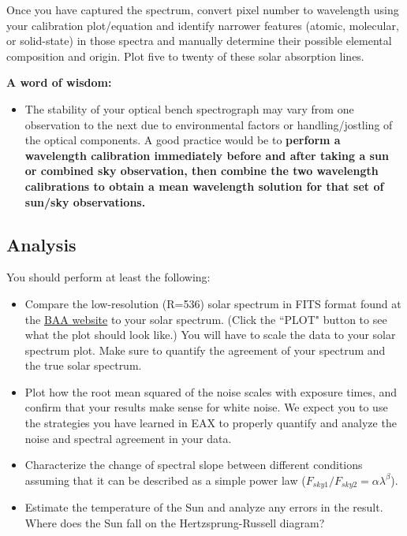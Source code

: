 \documentclass{../lab}
\begin{document}
Once you have captured the spectrum, convert pixel number to wavelength using your calibration plot/equation and identify narrower features (atomic, molecular, or solid-state) in those spectra and manually determine their possible elemental composition and origin. Plot five to twenty of these solar absorption lines. 

\textbf{A word of wisdom:}

\begin{itemize}
    \item The stability of your optical bench spectrograph may vary from one observation to the next due to environmental factors or handling/jostling of the optical components. A good practice would be to \textbf{perform a wavelength calibration immediately before and after taking a sun or combined sky observation, then combine the two wavelength calibrations to obtain a mean wavelength solution for that set of sun/sky observations.}
\end{itemize}



\subsection{Analysis}

You should perform at least the following:

\begin{itemize}
    \item Compare the low-resolution (R=536) solar spectrum in FITS format found at the \href{https://britastro.org/specdb/data.phpto}{BAA website} to your solar spectrum. (Click the ``PLOT" button to see what the plot should look like.) You will have to scale the data to your solar spectrum plot. Make sure to quantify the agreement of your spectrum and the true solar spectrum.
    \item Plot how the root mean squared of the noise scales with exposure times, and confirm that your results make sense for white noise. We expect you to use the strategies you have learned in EAX to properly quantify and analyze the noise and spectral agreement in your data.
    \item Characterize the change of spectral slope between different conditions assuming that it can be described as a simple power law ($F_{sky1}/F_{sky2}=\alpha \lambda^\beta$).
    \item Estimate the temperature of the Sun and analyze any errors in the result. Where does the Sun fall on the Hertzsprung-Russell diagram?%
\end{itemize}
\end{document}
